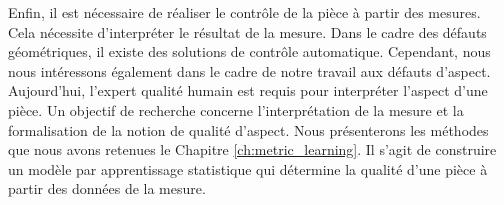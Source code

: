 Enfin, il est nécessaire de réaliser le contrôle de la pièce à partir des mesures.
Cela nécessite d'interpréter le résultat de la mesure.
Dans le cadre des défauts géométriques, il existe des solutions de contrôle automatique.
Cependant, nous nous intéressons également dans le cadre de notre travail aux défauts d'aspect.
Aujourd'hui, l'expert qualité humain est requis pour interpréter l'aspect d'une pièce.
Un objectif de recherche concerne l'interprétation de la mesure et la formalisation de la notion de qualité d'aspect.
Nous présenterons les méthodes que nous avons retenues le Chapitre \ref{ch:metric_learning}.
Il s'agit de construire un modèle par apprentissage statistique qui détermine la qualité d'une pièce à partir des données de la mesure.